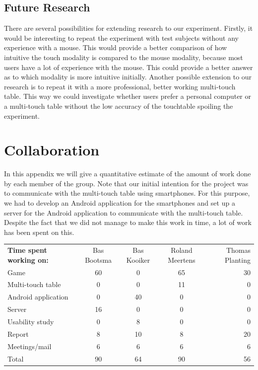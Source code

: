 \documentclass[a4paper,10pt]{report}
\begin{document}
\section{Future Research}
There are several possibilities for extending research to our experiment.
Firstly, it would be interesting to repeat the experiment with test subjects without any experience with a mouse.
This would provide a better comparison of how intuitive the touch modality is compared to the mouse modality, because most users have a lot of experience with the mouse. This could provide a better answer as to which modality is more intuitive initially. Another possible extension to our research is to repeat it with a more professional, better working multi-touch table. This way we could investigate whether users prefer a personal computer or a multi-touch table without the low accuracy of the touchtable spoiling the experiment. 

\appendix
\chapter{Collaboration}
\label{chap:collaboration}

In this appendix we will give a quantitative estimate of the amount of work done by each member of the group.
Note that our initial intention for the project was to communicate with the multi-touch table using smartphones.
For this purpose, we had to develop an Android application for the smartphones and set up a server for the Android application to communicate with the multi-touch table.
Despite the fact that we did not manage to make this work in time, a lot of work has been spent on this.

\noindent
 \begin{tabular}{ l c c c r }                               
  \textbf{Time spent working on:}  & Bas Bootsma & Bas Kooiker & Roland Meertens & Thomas Planting \\
  Game& 60 & 0 &  65&30\\
  Multi-touch table& 0 & 0&11&0 \\
  Android application& 0 & 40&0&0 \\
  Server &16 & 0 &0&0\\
  Usability study&0&8&0&0\\
  Report &8 & 10&8&20\\
  Meetings/mail &6&6&6&6\\
  Total&90&64&90&56\\
\end{tabular}



\end{document}

